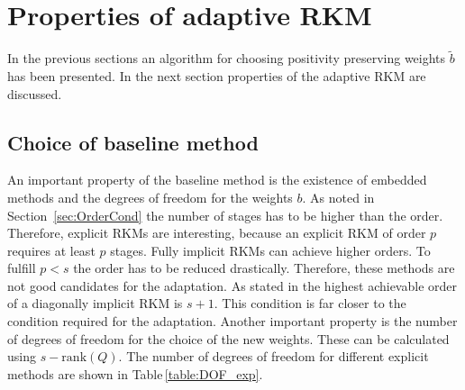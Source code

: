 \documentclass[a4paper]{article}
\numberwithin{equation}{section}
\theoremstyle{plain}
\theoremstyle{definition}
\numberwithin{theorem}{section}
\newcommand{\1}{\mathbbm{1}}
\begin{document}
 
\section{Properties of adaptive RKM} \label{sec:integration}

In the previous sections an algorithm for choosing positivity preserving weights $\tilde{b}$ has been presented.
In the next section properties of the adaptive RKM are discussed. 

\subsection{Choice of baseline method}
An important property of the baseline method is the existence of embedded methods and the degrees of freedom for the weights $b$.
As noted in Section~\ref{sec:OrderCond} the number of stages has to be higher than the order.
Therefore, explicit RKMs are interesting, because an explicit RKM of order $p$ requires at least $p$ stages.
Fully implicit RKMs can achieve higher orders.
To fulfill $p<s$ the order has to be reduced drastically. Therefore, these methods are not good candidates for the adaptation. 
As stated in \cite{norsett_attainable_1977} the highest achievable order of a diagonally implicit RKM is $s+1$. This condition is far closer to the condition required for the adaptation.
Another important property is the number of degrees of freedom for the choice of the new weights.  
These can be calculated using $s-\mathrm{rank}(Q)$. %
The number of degrees of freedom for different explicit methods are shown in Table\,\ref{table:DOF_exp}.
 
\end{document}

